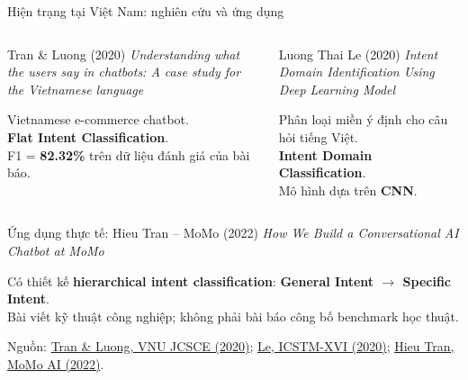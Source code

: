 \documentclass[10pt,aspectratio=169]{beamer}
\newcommand{\kw}[1]{\textcolor{uitblue}{\bfseries #1}}
\begin{document}
\begin{frame}{Hiện trạng tại Việt Nam: nghiên cứu và ứng dụng}
\small
\begin{columns}[T,onlytextwidth]
\begin{uitbox}{Tran \& Luong (2020)}
\scriptsize\textsl{Understanding what the users say in chatbots: A case study for the Vietnamese language}
\par\vspace{0.12cm}
\small Vietnamese e-commerce chatbot.\\
\kw{Flat Intent Classification}.\\
F1 = \textbf{82.32\%} trên dữ liệu đánh giá của bài báo.
\end{uitbox}
\begin{uitbox}{Luong Thai Le (2020)}
\scriptsize\textsl{Intent Domain Identification Using Deep Learning Model}
\par\vspace{0.12cm}
\small Phân loại miền ý định cho câu hỏi tiếng Việt.\\
\kw{Intent Domain Classification}.\\
Mô hình dựa trên \textbf{CNN}.
\end{uitbox}
\end{columns}
\vspace{0.2cm}
\begin{greenbox}{Ứng dụng thực tế: Hieu Tran -- MoMo (2022)}
\scriptsize\textsl{How We Build a Conversational AI Chatbot at MoMo}
\par\vspace{0.1cm}
\small Có thiết kế \kw{hierarchical intent classification}:\quad
\textbf{General Intent $\rightarrow$ Specific Intent}.\\
Bài viết kỹ thuật công nghiệp; không phải bài báo công bố benchmark học thuật.
\end{greenbox}
\vspace{0.08cm}
{\tiny Nguồn: \href{https://js.vnu.edu.vn/CS/article/view/4202}{Tran \& Luong, VNU JCSCE (2020)};
\href{https://proceeding.conferenceworld.in/ICSTM-XVI/5.pdf}{Le, ICSTM-XVI (2020)};
\href{https://ai.momo.vn/blog/how-we-build-a-conversational-ai-chatbot-at-momo}{Hieu Tran, MoMo AI (2022)}.}
\end{frame}
\end{document}
